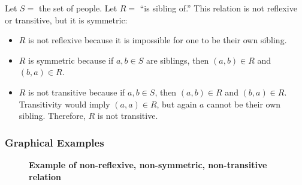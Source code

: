 Let \(S=\) the set of people. Let \(R=\) ``is sibling of.'' This relation is not reflexive or transitive, but it is symmetric:
\begin{itemize}
    \item \(R\) is not reflexive because it is impossible for one to be their own sibling.
    \item \(R\) is symmetric because if \(a,b\in S\) are siblings, then \((a,b)\in R\) and \((b,a)\in R\).
    \item \(R\) is not transitive because if \(a,b\in S\), then \((a,b)\in R\) and \((b,a)\in R\). Transitivity would imply \((a,a)\in R\), but again \(a\)
    cannot be their own sibling. Therefore, \(R\) is not transitive. 
\end{itemize}

\subsubsection{Graphical Examples}
\begin{figure}[H]
    \centering
    \textbf{Example of non-reflexive, non-symmetric, non-transitive relation}

\end{figure}

